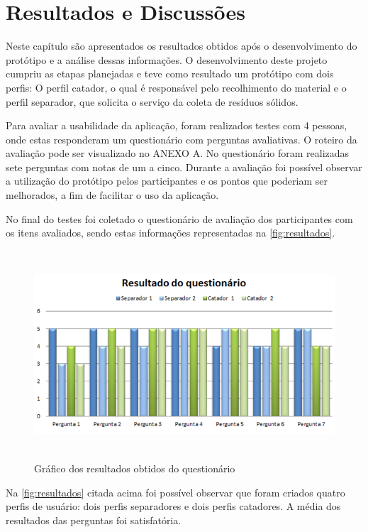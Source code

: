 
\chapter{Resultados e Discussões}
\label{cap:resultados}
 Neste capítulo são apresentados os resultados obtidos após o desenvolvimento do protótipo e a análise dessas informações. O desenvolvimento deste projeto cumpriu as etapas planejadas e teve como resultado um protótipo com dois perfis: O perfil catador, o qual é responsável pelo recolhimento do material e o perfil separador, que solicita o serviço da coleta de resíduos sólidos.

Para avaliar a usabilidade da aplicação, foram realizados testes com 4 pessoas, onde estas responderam um questionário com perguntas avaliativas. O roteiro da avaliação pode ser visualizado no ANEXO A. No questionário foram realizadas sete perguntas com notas de um a cinco. Durante a avaliação foi possível observar a utilização do protótipo pelos participantes e os pontos que poderiam ser melhorados, a fim de facilitar o uso da aplicação.

No final do testes foi coletado o questionário de avaliação dos participantes com os itens avaliados, sendo estas informações representadas na \autoref{fig:resultados}.

\begin{figure}[H]
	\begin{Center}
		\includegraphics[width=5.0in,height=3.06in]{./media/resultados.png}
	\end{Center}
\caption{Gráfico dos resultados obtidos do questionário}
\label{fig:resultados}
\end{figure}

Na \autoref{fig:resultados} citada acima foi possível observar que foram criados quatro perfis de usuário: dois perfis separadores e dois perfis catadores. A média dos resultados das perguntas foi satisfatória.

